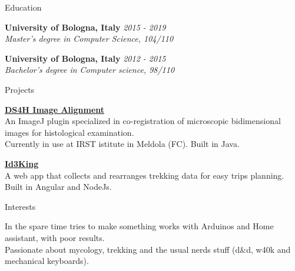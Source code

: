 \documentclass{../resume} %
\begin{document}
\begin{rSection}{Education}

{\bf University of Bologna, Italy } \hfill {\em 2015 - 2019} 
\\{ \textit {Master's degree in Computer Science, 104/110 }} 

{\bf University of Bologna, Italy } \hfill {\em 2012 - 2015} 
\\ { \textit {Bachelor's degree in Computer science, 98/110 }} \hfill


\end{rSection}


\begin{rSection}{Projects}

{\bf \href{https://imagej.net/plugins/ds4h-image-alignment}{DS4H Image Alignment}}
\\ An ImageJ plugin specialized in co-registration of microscopic bidimensional images for histological examination.\\
Currently in use at IRST istitute in Meldola (FC). Built in Java.

{\bf \href{https://github.com/illeb/id3king}{Id3King}}
\\ A web app that collects and rearranges trekking data for easy trips planning.\\
Built in Angular and NodeJs.

\end{rSection}


\begin{rSection}{Interests}

  In the spare time tries to make something works with Arduinos and Home assistant, with poor results. \\Passionate about mycology, trekking and the usual nerds stuff (d\&d, w40k and mechanical
 keyboards).
\end{rSection}
\end{document}
